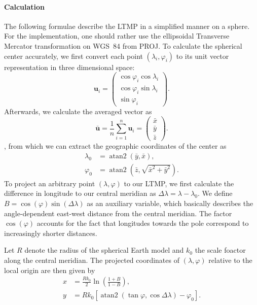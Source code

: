 \paragraph{Calculation}
The following formulae describe the LTMP in a simplified manner on a sphere.
For the implementation, one should rather use the ellipsoidal Transverse Mercator transformation on WGS~84 from PROJ.
To calculate the spherical center accurately, we first convert each point $(\lambda_i,\varphi_i)$ to its unit vector representation in three dimensional space:
\[
\mathbf{u}_i= \begin{pmatrix} \cos\varphi_i\cos\lambda_i\\ \cos\varphi_i\sin\lambda_i\\ \sin\varphi_i \end{pmatrix}.
\]
Afterwards, we calculate the averaged vector as 
\[
\bar{\mathbf{u}} = \frac{1}{n}\sum_{i=1}^{n}\mathbf{u}_i = \begin{pmatrix} \bar{x}\\ \bar{y}\\ \bar{z} \end{pmatrix}.
\]
, from which we can extract the geographic coordinates of the center as
\[
\begin{aligned}
    \lambda_0
    &=
    \operatorname{atan2}(\bar{y},\bar{x}), \\
    \varphi_0
    &=
    \operatorname{atan2}
    \left(
        \bar{z},
        \sqrt{\bar{x}^2+\bar{y}^2}
    \right).
\end{aligned}
\]
To project an arbitrary point $(\lambda, \varphi)$ to our LTMP, we first calculate the difference in longitude to our central meridian as
$\Delta\lambda=\lambda-\lambda_0.$
We define $B=\cos(\varphi)\sin(\Delta\lambda)$ as an auxiliary variable, which basically describes the angle-dependent east-west 
distance from the central meridian. The factor $\cos(\varphi)$ accounts for the fact that
longitudes towards the pole correspond to increasingly shorter distances.

Let $R$ denote the radius of the spherical Earth model and $k_0$ the scale foactor along the central meridian. 
The projected coordinates of $(\lambda, \varphi)$ relative to the local origin are then given by
\[
\begin{aligned}
    x
    &=
    \frac{Rk_0}{2}
    \ln\left(\frac{1+B}{1-B}\right), \\
    y
    &=
    Rk_0
    \left[
        \operatorname{atan2}
        \left(
            \tan\varphi,
            \cos\Delta\lambda
        \right)
        -\varphi_0
    \right].
\end{aligned}
\]

